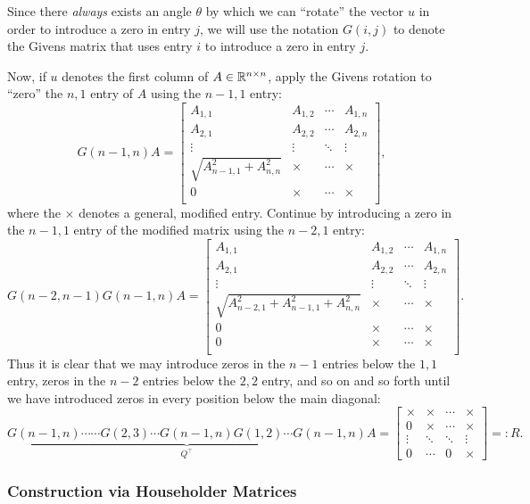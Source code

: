 Since there {\em always} exists an angle $\theta$ by which we can ``rotate'' the vector $u$ in order to introduce a zero in entry $j$, we will use the notation $G(i,j)$ to denote the Givens matrix that uses entry $i$ to introduce a zero in entry $j$.

Now, if $u$ denotes the first column of $A\in\mathbb{R}^{n\times n}$, apply the Givens rotation to ``zero'' the $n,1$ entry of $A$ using the $n-1,1$ entry:
\[
G(n-1,n)A = \begin{bmatrix}
A_{1,1} & A_{1,2} & \cdots & A_{1,n}\\
A_{2,1} & A_{2,2} & \cdots & A_{2,n}\\
\vdots & \vdots & \ddots & \vdots\\
\sqrt{A_{n-1,1}^2+A_{n,n}^2} & \times & \cdots & \times\\
0 & \times & \cdots & \times\\
\end{bmatrix},
\]
where the $\times$ denotes a general, modified entry. Continue by introducing a zero in the $n-1,1$ entry of the modified matrix using the $n-2,1$ entry:
\[
G(n-2,n-1)G(n-1,n)A = \begin{bmatrix}
A_{1,1} & A_{1,2} & \cdots & A_{1,n}\\
A_{2,1} & A_{2,2} & \cdots & A_{2,n}\\
\vdots & \vdots & \ddots & \vdots\\
\sqrt{A_{n-2,1}^2+A_{n-1,1}^2+A_{n,n}^2} & \times & \cdots & \times\\
0 & \times & \cdots & \times\\
0 & \times & \cdots & \times\\
\end{bmatrix}.
\]
Thus it is clear that we may introduce zeros in the $n-1$ entries below the $1,1$ entry, zeros in the $n-2$ entries below the $2,2$ entry, and so on and so forth until we have introduced zeros in every position below the main diagonal:
\[
\underbrace{G(n-1,n)\cdots \cdots G(2,3)\cdots G(n-1,n) G(1,2) \cdots G(n-1,n)}_{Q^\top}A = \begin{bmatrix}
\times & \times & \cdots & \times\\
0 & \times & \cdots & \times\\
\vdots & \ddots & \ddots & \vdots\\
0 & \cdots & 0 & \times
\end{bmatrix} =: R.
\]

\subsubsection{Construction via Householder Matrices}


